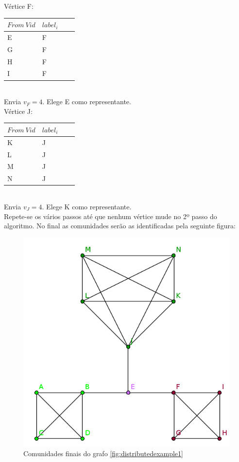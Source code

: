 \documentclass[a4paper,10pt]{report}
\begin{document}
Vértice F:
  \begin{tabular}{| l | l | l | l |}
  \hline
  $From~Vid$ & $label_i$\\ \hline
  E & F \\ \hline
  G & F \\ \hline
  H & F \\ \hline
  I & F \\ \hline
  \end{tabular}  
\\[0.25cm]
  Envia $v_F = 4$. Elege E como representante.
  \\[0.25cm]
Vértice J:
  \begin{tabular}{| l | l | l | l |}
  \hline
  $From~Vid$ & $label_i$\\ \hline
  K & J \\ \hline
  L & J \\ \hline
  M & J \\ \hline
  N & J \\ \hline
  \end{tabular}  
\\[0.25cm]
  Envia $v_J = 4$. Elege K como representante.
\\[0.25cm]
  Repete-se os vários passos até que nenhum vértice mude no 2º passo do 
algoritmo. No final as comunidades serão as identificadas pela seguinte figura:

\begin{figure}[h]
  \center
  \includegraphics{graph1_end}
  \caption{Comunidades finais do grafo \ref{fig:distributedexample1}}
\end{figure}


  
\end{document}

